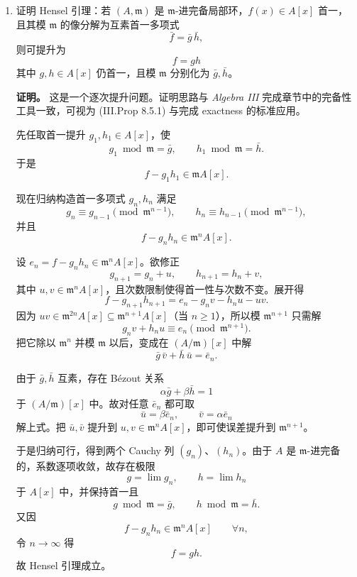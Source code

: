 \documentclass[a4paper]{ctexart}
\begin{document}
\begin{enumerate}[leftmargin=*, label=\textbf{10.\arabic*.}]
另一方面，若 \(\mathfrak a\subseteq J(A)\)，则对任意有限生成 \(M\neq 0\)，由上一题知
\[
\operatorname{Supp}(M)\cap V(\mathfrak a)\neq \varnothing,
\]
所以 \(\widehat M\neq 0\)。这正是 faithful flatness 的模判据。

而 \(\mathfrak a\subseteq J(A)\) 正是 Zariski ring 的定义之一，所以结论成立。

\setcounter{enumi}{8}
\item 证明 Hensel 引理：若 \((A,\mathfrak m)\) 是 \(\mathfrak m\)-进完备局部环，\(f(x)\in A[x]\) 首一，且其模 \(\mathfrak m\) 的像分解为互素首一多项式
\[
\bar f=\bar g\,\bar h,
\]
则可提升为
\[
f=gh
\]
其中 \(g,h\in A[x]\) 仍首一，且模 \(\mathfrak m\) 分别化为 \(\bar g,\bar h\)。

\textbf{证明。}
这是一个逐次提升问题。证明思路与 \textit{Algebra III} 完成章节中的完备性工具一致，可视为 (III.Prop 8.5.1) 与完成 exactness 的标准应用。

先任取首一提升 \(g_1,h_1\in A[x]\)，使
\[
g_1\bmod \mathfrak m=\bar g,\qquad h_1\bmod \mathfrak m=\bar h.
\]
于是
\[
f-g_1h_1\in \mathfrak m A[x].
\]

现在归纳构造首一多项式 \(g_n,h_n\) 满足
\[
g_n\equiv g_{n-1}\pmod{\mathfrak m^{n-1}},\qquad
h_n\equiv h_{n-1}\pmod{\mathfrak m^{n-1}},
\]
并且
\[
f-g_nh_n\in \mathfrak m^nA[x].
\]

设 \(e_n=f-g_nh_n\in \mathfrak m^nA[x]\)。欲修正
\[
g_{n+1}=g_n+u,\qquad h_{n+1}=h_n+v,
\]
其中 \(u,v\in \mathfrak m^nA[x]\)，且次数限制使得首一性与次数不变。展开得
\[
f-g_{n+1}h_{n+1}
=e_n-g_nv-h_nu-uv.
\]
因为 \(uv\in \mathfrak m^{2n}A[x]\subseteq \mathfrak m^{n+1}A[x]\)（当 \(n\ge 1\)），所以模 \(\mathfrak m^{n+1}\) 只需解
\[
g_nv+h_nu\equiv e_n \pmod{\mathfrak m^{n+1}}.
\]
把它除以 \(\mathfrak m^n\) 并模 \(\mathfrak m\) 以后，变成在 \((A/\mathfrak m)[x]\) 中解
\[
\bar g\,\bar v+\bar h\,\bar u=\bar e_n.
\]

由于 \(\bar g,\bar h\) 互素，存在 Bézout 关系
\[
\alpha \bar g+\beta \bar h=1
\]
于 \((A/\mathfrak m)[x]\) 中。故对任意 \(\bar e_n\) 都可取
\[
\bar u=\beta \bar e_n,\qquad \bar v=\alpha \bar e_n
\]
解上式。把 \(\bar u,\bar v\) 提升到 \(u,v\in \mathfrak m^nA[x]\)，即可使误差提升到 \(\mathfrak m^{n+1}\)。

于是归纳可行，得到两个 Cauchy 列 \((g_n)\)、\((h_n)\)。由于 \(A\) 是 \(\mathfrak m\)-进完备的，系数逐项收敛，故存在极限
\[
g=\lim g_n,\qquad h=\lim h_n
\]
于 \(A[x]\) 中，并保持首一且
\[
g\bmod \mathfrak m=\bar g,\qquad h\bmod \mathfrak m=\bar h.
\]
又因
\[
f-g_nh_n\in \mathfrak m^nA[x]\qquad \forall n,
\]
令 \(n\to\infty\) 得
\[
f=gh.
\]
故 Hensel 引理成立。
\end{enumerate}
\end{document}
